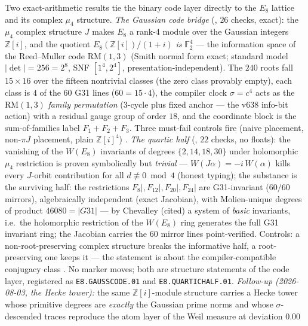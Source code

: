 \documentclass[11pt,a4paper]{article}
\theoremstyle{definition}
\begin{document}
\begin{keybox}
Two exact-arithmetic results tie the binary code layer directly to
the $E_8$ lattice and its complex $\mu_4$ structure.  \emph{The
Gaussian code bridge} (, $26$
checks, exact): the $\mu_4$ complex structure $J$ makes $E_8$ a
rank-4 module over the Gaussian integers $\mathbb{Z}[i]$, and the
quotient $E_8(\mathbb{Z}[i])/(1+i)$ \emph{is} $\mathbb{F}_2^4$ ---
the information space of the Reed--Muller code $\mathrm{RM}(1,3)$
(Smith normal form exact; standard model $|\det|=256=2^8$, SNF
$[1^4,2^4]$, presentation-independent).  The $240$ roots fall
$15\times16$ over the fifteen nontrivial classes (the zero class
provably empty), each class is $4$ of the $60$ G31 lines
($60=15\cdot4$), the compiler clock $\sigma=c^4$ acts as the
$\mathrm{RM}(1,3)$ \emph{family permutation} (3-cycle plus fixed
anchor --- the v638 info-bit action) with a residual gauge group of
order $18$, and the coordinate block is the sum-of-families label
$F_1{+}F_2{+}F_3$.  Three must-fail controls fire (naive placement,
non-$\pi J$ placement, plain $\mathbb{Z}[i]^4$) \mE.  \emph{The
quartic half} (, $22$ checks, no
floats): the vanishing of the $W(E_8)$ invariants of degrees
$\{2,14,18,30\}$ under holomorphic $\mu_4$ restriction is proven
symbolically but \emph{trivial} --- $W(J\alpha)=-i\,W(\alpha)$ kills
every $J$-orbit contribution for all $d\not\equiv0\bmod4$ (honest
typing); the substance is the surviving half: the restrictions
$F_8|,F_{12}|,F_{20}|,F_{24}|$ are G31-invariant ($60/60$ mirrors),
algebraically independent (exact Jacobian), with Molien-unique
degrees of product $46080=|G31|$ --- by Chevalley (cited) a system
of \emph{basic} invariants, i.e.\ the holomorphic restriction of
the $W(E_8)$ ring generates the full G31 invariant ring; the
Jacobian carries the $60$ mirror lines point-verified.  Controls: a
non-root-preserving complex structure breaks the informative half,
a root-preserving one keeps it --- the statement is about the
compiler-compatible conjugacy class \mE.  No marker moves; both are
structure statements of the code layer, registered as
\texttt{E8.GAUSSCODE.01} and \texttt{E8.QUARTICHALF.01}.
\emph{Follow-up (2026-08-03, the Hecke tower):} the same
$\mathbb{Z}[i]$-module structure carries a Hecke tower whose
primitive degrees are \emph{exactly} the Gaussian prime norms and
whose $\sigma$-descended traces reproduce the atom layer of the Weil
measure at deviation $0.00$

\end{keybox}
\end{document}
